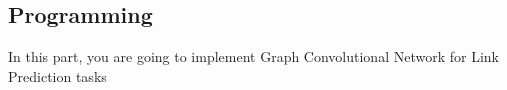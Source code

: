 \subsection*{Programming }

In this part, you are going to implement Graph Convolutional Network for Link Prediction tasks\\
%




%



\clearpage

%
